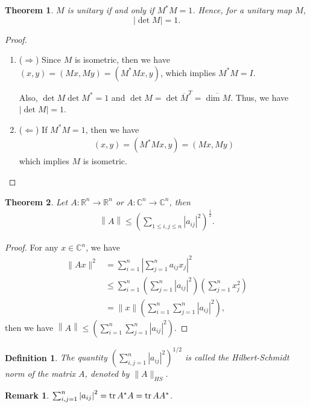 \documentclass[10pt]{book}
\newtheorem{definition}{Definition}[chapter]
\newtheorem{theorem}{Theorem}[chapter]
\newtheorem{remark}{Remark}[chapter]
\theoremstyle{definition}
\numberwithin{equation}{chapter}
\begin{document}
\begin{theorem}
$M$ is unitary if and only if $M^*M = 1$. Hence, for a unitary map $M$, $$\left|\det M\right| = 1.$$
\end{theorem}
\begin{proof}
~\begin{enumerate}[label=(\arabic*)]
    \item ($\Rightarrow$) Since $M$ is isometric, then we have $(x,y) = (Mx, My) = (M^* M x, y)$, which implies $M^* M = I$.
    
    Also, $\det M \det M^* = 1$ and $\det M = \det \overline{M}^T = \overline{\dim M}$. Thus, we have $|\det M| = 1$.
    \item ($\Leftarrow$) If $M^*M = 1$, then we have
    \begin{align*}
        (x,y) = (M^* M x, y) = (Mx, My)
    \end{align*}
    which implies $M$ is isometric.
\end{enumerate}
\end{proof}

\medskip

\begin{theorem}
Let $A:\mathbb{R}^n \to \mathbb{R}^n$ or $A:\mathbb{C}^n \to \mathbb{C}^n$, then 
\begin{align*}
    \left\|A\right\| \leq \left(\sum_{1\leq i,j\leq n} \left|a_{ij}\right|^2\right)^{\frac{1}{2}}.
\end{align*}
\end{theorem}
\begin{proof}
For any $x\in \mathbb{C}^n$, we have
\begin{align*}
    \|Ax\|^2 & = \sum^n_{i=1} \left|\sum^n_{j=1}a_{ij} x_j\right|^2 \\
    & \leq \sum^n_{i=1} \left(\sum^n_{j=1}\left|a_{ij}\right|^2 \right) \left(\sum^n_{j=1} x_j^2 \right) \\
    & = \|x\| \left(\sum^n_{i=1}\sum^n_{j=1}\left|a_{ij}\right|^2 \right),
\end{align*}
then we have $\left\|A\right\|\leq \left(\sum^n_{i=1}\sum^n_{j=1}\left|a_{ij}\right|^2 \right)$.
\end{proof}

\begin{definition}
The quantity $\left(\sum^n_{i,j=1}\left|a_{ij}\right|^2 \right)^{1/2}$ is called the Hilbert-Schmidt norm of the matrix $A$, denoted by $\|A\|_{HS}$. 
\end{definition}

\begin{remark}
$\sum^n_{i,j=1}\left|a_{ij}\right|^2 = \tr A^*A = \tr AA^*$.
\end{remark}
\end{document}
